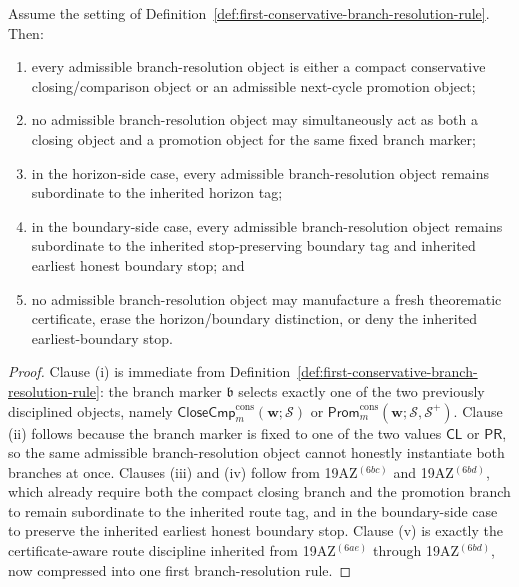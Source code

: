 \begin{proposition}
\label{prop:every-conservative-return-object-admits-exactly-one-honest-branch-choice-at-a-time-close-or-promote}
Assume the setting of Definition~\ref{def:first-conservative-branch-resolution-rule}. Then:
\begin{enumerate}[label=(\roman*)]
 \item every admissible branch-resolution object is either a compact conservative closing/comparison object or an admissible next-cycle promotion object;
 \item no admissible branch-resolution object may simultaneously act as both a closing object and a promotion object for the same fixed branch marker;
 \item in the horizon-side case, every admissible branch-resolution object remains subordinate to the inherited horizon tag;
 \item in the boundary-side case, every admissible branch-resolution object remains subordinate to the inherited stop-preserving boundary tag and inherited earliest honest boundary stop; and
 \item no admissible branch-resolution object may manufacture a fresh theorematic certificate, erase the horizon/boundary distinction, or deny the inherited earliest-boundary stop.
\end{enumerate}
\end{proposition}

\begin{proof}
Clause (i) is immediate from Definition~\ref{def:first-conservative-branch-resolution-rule}: the branch marker \(\mathfrak b\) selects exactly one of the two previously disciplined objects, namely \(\mathsf{CloseCmp}^{\mathrm{cons}}_{m}(\mathbf w;\mathcal S)\) or \(\mathsf{Prom}^{\mathrm{cons}}_{m}(\mathbf w;\mathcal S,\mathcal S^{+})\). Clause (ii) follows because the branch marker is fixed to one of the two values \(\mathsf{CL}\) or \(\mathsf{PR}\), so the same admissible branch-resolution object cannot honestly instantiate both branches at once. Clauses (iii) and (iv) follow from 19AZ$^{(6bc)}$ and 19AZ$^{(6bd)}$, which already require both the compact closing branch and the promotion branch to remain subordinate to the inherited route tag, and in the boundary-side case to preserve the inherited earliest honest boundary stop. Clause (v) is exactly the certificate-aware route discipline inherited from 19AZ$^{(6ae)}$ through 19AZ$^{(6bd)}$, now compressed into one first branch-resolution rule.
\end{proof}

